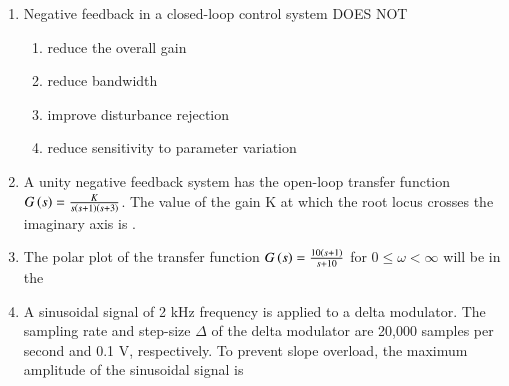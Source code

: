 \documentclass[a4paper, 11pt]{article}
\begin{document}
\begin{enumerate}
    \hfill{}

    \item Negative feedback in a closed-loop control system DOES NOT
    \begin{enumerate}
        \item reduce the overall gain
        \item reduce bandwidth
        \item improve disturbance rejection
        \item reduce sensitivity to parameter variation
    \end{enumerate}
    
    \hfill{}

    \item A unity negative feedback system has the open-loop transfer function $G\left(s\right)=\frac{K}{s\left(s+1\right)\left(s+3\right)}$. The value of the gain K  at which the root locus crosses the imaginary axis is \underline{\hspace{2cm}}.
    
    \hfill{}

    \item The polar plot of the transfer function $G\left(s\right)=\frac{10\left(s+1\right)}{s+10}$ for $0\le\omega<\infty$ will be in the
    \begin{enumerate}
    \end{enumerate}
    
    \hfill{}

    \item A sinusoidal signal of 2 kHz frequency is applied to a delta modulator. The sampling rate and step-size $\Delta$ of the delta modulator are 20,000 samples per second and 0.1 V, respectively. To prevent slope overload, the maximum amplitude of the sinusoidal signal  is
    \begin{enumerate}
    \end{enumerate}
    

\end{enumerate}
\end{document}
